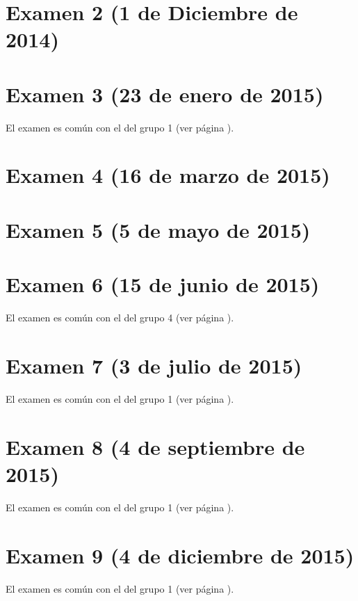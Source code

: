 \documentclass[a4paper,12pt,twoside]{book}
\begin{document}
\section{Examen 2 (1 de Diciembre de 2014)}
\section{Examen 3 (23 de enero de 2015)}
El examen es común con el del grupo 1 (ver página \pageref{examen_14_15_1_3}).
\section{Examen 4 (16 de marzo de 2015)}
\section{Examen 5 (5 de mayo de 2015)}
\section{Examen 6 (15 de junio de 2015)}
El examen es común con el del grupo 4 (ver página \pageref{examen_14_15_4_6}).
\section{Examen 7 (3 de julio de 2015)}
El examen es común con el del grupo 1 (ver página \pageref{examen_14_15_1_7}).
\section{Examen 8 (4 de septiembre de 2015)}
El examen es común con el del grupo 1 (ver página \pageref{examen_14_15_1_8}).
\section{Examen 9 (4 de diciembre de 2015)}
El examen es común con el del grupo 1 (ver página \pageref{examen_14_15_1_9}).

\appendix %






\nocite{Alonso-12b}
\nocite{Bird-99a}
\nocite{Cunningham-10a}
\nocite{Daume-06}
\nocite{Davie-92a}
\nocite{Doets-04a}
\nocite{Fokker-96}
\nocite{Hudak-00a}
\nocite{Hudak-12a}
\nocite{Hutton-07a}
\nocite{OSullivan-08a}
\nocite{Rabhi-99a}
\nocite{Polya-65a}
\nocite{Ruiz-04}
\nocite{Thompson-11a}



\end{document}
